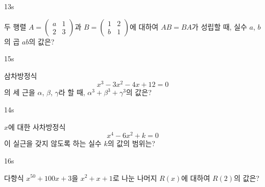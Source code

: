 \documentclass[10pt]{article}
\begin{document}
\begin{pagepair}
\noindent
\begin{minipage}[t][\probboxheight][t]{0.46\linewidth}
\begin{problem}{13}{s}
\par\smallskip
두 행렬 $A = \begin{pmatrix} a & 1 \\ 2 & 3 \end{pmatrix}$과 $B = \begin{pmatrix} 1 & 2 \\ b & 1 \end{pmatrix}$에 대하여 $AB = BA$가 성립할 때, 실수 $a$, $b$의 곱 $ab$의 값은?
\begin{choices}
\end{choices}
\end{problem}
\end{minipage}\hfill
\begin{minipage}[t][\probboxheight][t]{0.46\linewidth}
\begin{problem}{15}{s}
\par\smallskip
삼차방정식
\[ x^3 - 3x^2 - 4x + 12 = 0 \]
의 세 근을 $\alpha$, $\beta$, $\gamma$라 할 때, $\alpha^3 + \beta^3 + \gamma^3$의 값은?
\begin{choices}
\end{choices}
\end{problem}
\end{minipage}
\par\vspace{4mm}
\noindent
\begin{minipage}[t][\probboxheight][t]{0.46\linewidth}
\begin{problem}{14}{s}
\par\smallskip
$x$에 대한 사차방정식
\[ x^4 - 6x^2 + k = 0 \]
이 실근을 갖지 않도록 하는 실수 $k$의 값의 범위는?
\begin{choices}
\end{choices}
\end{problem}
\end{minipage}\hfill
\begin{minipage}[t][\probboxheight][t]{0.46\linewidth}
\begin{problem}{16}{s}
\par\smallskip
다항식 $x^{50} + 100x + 3$을 $x^2 + x + 1$로 나눈 나머지 $R(x)$에 대하여 $R(2)$의 값은?
\begin{choices}
\end{choices}
\end{problem}
\end{minipage}
\end{pagepair}
\end{document}
